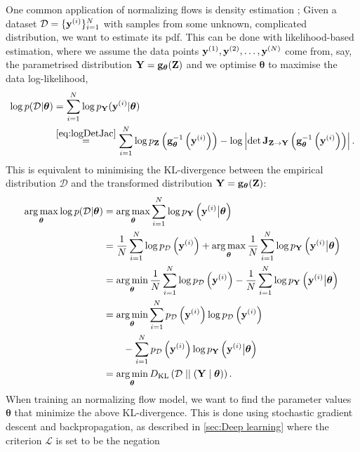 \documentclass{statsmsc}
\begin{document}
{One common application of normalizing flows is density estimation \citep{normalizing_flows};
Given a dataset $\mathcal{D}=\{\mathbf{y}^{(i)}\}_{i=1}^N$ with samples from some
unknown, complicated distribution, we want to estimate its \ac{pdf}.
This can be done with likelihood-based estimation, where we assume the data points
$\mathbf{y}^{(1)}, \mathbf{y}^{(2)},\dots,\mathbf{y}^{(N)}$ come from, say,
the parametrised distribution $\mathbf{Y}=\mathbf{g}_{\bm \theta}(\mathbf{Z})$ and
we optimise $\bm\theta$ to maximise the data log-likelihood,
\begin{align}
    \log p(\mathcal{D}| \bm\theta)
    & = \sum_{i=1}^N \log p_\bfY(\bfy^{(i)}| \bm\theta ) \\
    &\stackrel{\cref{eq:logDetJac}}{=} \sum^{N}_{i=1}
    \log p_\bfZ\left(\mathbf{g}_{\bm\theta}^{-1}\left(\bfy^{(i)}\right)\right) - \log \left|\det \mathbf{J}_{\bfZ \rightarrow {\bfY}}\left(\mathbf{g}_{\bm\theta}^{-1}\left(\bfy^{(i)}\right)\right) \right|. \label{eq:logProbKL}
\end{align}
This is equivalent to minimising the \ac{KL-divergence} between the empirical distribution
$\mathcal{D}$ and the transformed distribution $\mathbf{Y}=\mathbf{g}_{\bm\theta}(\mathbf{Z})$:
\begin{align}
    \operatorname*{arg\,max}_{\bm\theta} \log p(\mathcal{D}| \bm\theta)
    &= \operatorname*{arg\,max}_{\bm\theta}\sum_{i=1}^N \log p_{\mathbf{Y}} \left(\mathbf{y}^{(i)}\big|\bm\theta \right) \\
    &=\frac{1}{N}  \sum_{i=1}^N \log p_{\mathcal{D}}\left(\mathbf{y}^{(i)}\right)
        +\operatorname*{arg\,max}_{\bm\theta}\frac{1}{N} \sum_{i=1}^N \log p_{\mathbf{Y}} \left(\mathbf{y}^{(i)}\big|\bm\theta \right) \\
    &= \operatorname*{arg\,min}_{\bm\theta}\frac{1}{N}  \sum_{i=1}^N \log p_{\mathcal{D}}\left(\mathbf{y}^{(i)}\right)
    -\frac{1}{N} \sum_{i=1}^N \log p_{\mathbf{Y}} \left(\mathbf{y}^{(i)}\big|\bm\theta \right) \\
    &= \operatorname*{arg\,min}_{\bm\theta}\sum^{N}_{i=1}  p_\mathcal{D}\left(\mathbf{y}^{(i)}\right)  \log p_{\mathcal{D}}\left(\mathbf{y}^{(i)}\right) \\
    &\qquad- \sum_{i=1}^N  p_\mathcal{D}\left(\mathbf{y}^{(i)}\right) \log p_{\mathbf{Y}} \left(\mathbf{y}^{(i)}\big|\bm\theta \right) \\
    &= \operatorname*{arg\,min}_{\bm\theta} D_{\textrm{KL}}\left(\mathcal{D}\;||\; (\mathbf{Y}\mid\bm\theta)\right).
\end{align}
When training an normalizing flow model, we want to find the parameter values
$\bm\theta$ that minimize the above \ac{KL-divergence}.
This is done using stochastic gradient descent and backpropagation, as described in
\cref{sec:Deep learning} where the criterion $\mathcal{L}$ is set to be the negation
}
\end{document}
